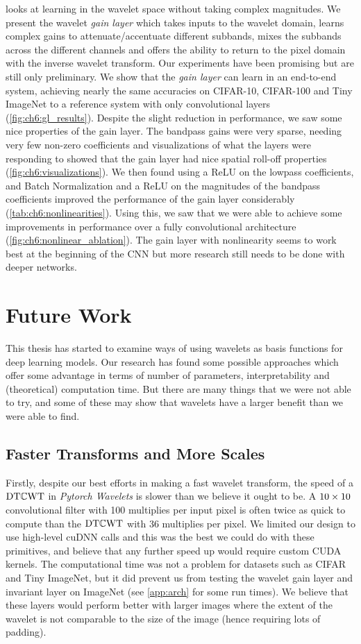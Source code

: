 \textbf{} looks at learning in the wavelet space without
taking complex magnitudes. We present the wavelet \emph{gain layer} which takes
inputs to the wavelet domain, learns complex gains to attenuate/accentuate
different subbands, mixes the subbands across the different channels and offers
the ability to return to the pixel domain with the inverse wavelet transform.
Our experiments have been promising but are still only preliminary. We
show that the \emph{gain layer} can learn in an end-to-end system, achieving nearly
the same accuracies on CIFAR-10, CIFAR-100 and Tiny ImageNet to a reference system with
only convolutional layers (\autoref{fig:ch6:gl_results}).
Despite the slight reduction in performance, we saw some
nice properties of the gain layer. The bandpass gains were very sparse,
needing very few non-zero coefficients and visualizations of what the layers
were responding to showed that the gain layer had nice
spatial roll-off properties (\autoref{fig:ch6:visualizations}).
We then found using a ReLU on the lowpass coefficients, and
Batch Normalization and a ReLU on the magnitudes of the bandpass coefficients
improved the performance of the gain layer considerably (\autoref{tab:ch6:nonlinearities}).
Using this, we
saw that we were able to achieve some improvements in performance over a fully
convolutional architecture (\autoref{fig:ch6:nonlinear_ablation}). The gain 
layer with nonlinearity seems to work best at the beginning of the CNN but more research still
needs to be done with deeper networks.

\section{Future Work}
This thesis has started to examine ways of using wavelets as basis functions for
deep learning models. Our research has found some possible approaches
which offer some advantage in terms of number of parameters, interpretability
and (theoretical) computation time. But there are many things that we were not
able to try, and some of these may show that wavelets have a larger benefit than
we were able to find.

\subsection{Faster Transforms and More Scales}
Firstly, despite our best efforts in making a fast wavelet transform, the speed
of a $\mathrm{DT}\mathbb{C}\mathrm{WT}$ in \emph{Pytorch Wavelets} is slower than we believe it ought to be. A $10\times 10$
convolutional filter with 100 multiplies per input pixel is often twice as
quick to compute than the $\mathrm{DT}\mathbb{C}\mathrm{WT}$ with 36 multiplies per pixel. We limited our
design to use high-level cuDNN calls and this was the best we could do with
these primitives, and believe that any further speed up would require custom CUDA
kernels. The computational time was not a problem for datasets such as CIFAR and Tiny
ImageNet, but it did prevent us from testing the wavelet gain layer and
invariant layer on ImageNet (see \autoref{app:arch} for some run times).
We believe that these layers would perform better with larger images where the
extent of the wavelet is not comparable to the size of the image (hence
requiring lots of padding).

